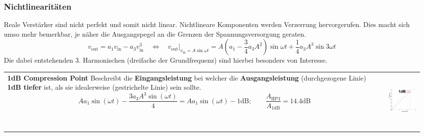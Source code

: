 \subsubsection{Nichtlinearitäten }
Reale Verstärker sind nicht perfekt und somit nicht linear. Nichtlineare Komponenten
werden Verzerrung hervorgerufen. Dies macht sich umso mehr bemerkbar, je näher
die Ausgangspegel an die Grenzen der Spannungsversorgung geraten.
$$ v_{\text{out}} = a_1 v_{\text{in}} - a_3 v_{\text{in}}^3 \quad \Longleftrightarrow \quad  
v_{\text{out}}|_{v_{\text{in}}=A \sin \omega t} = A(a_1 -\frac 34a_3A^2)\sin  \omega t
                      +\frac 14a_3A^3\sin 3\omega t$$
Die dabei entstehenden 3. Harmonischen (dreifache der Grundfrequenz) sind hierbei besonders von
Interesse. \\

\begin{tabular}{ll}
\parbox{12cm}{
    \textbf{1dB Compression Point} \\
    Beschreibt die \textbf{Eingangsleistung} bei welcher die \textbf{Ausgangsleistung}
    (durchgezogene Linie) \textbf{1dB tiefer} ist, als sie idealerweise (gestrichelte Linie) sein
    sollte. $$ A a_1 \sin(\omega t) - \frac{3 a_3 A^3 \sin(\omega t)}{4} = A a_1 \sin(\omega t) -
    1\text{dB}; \qquad \frac{A_{\text{IIP3}}}{A_{\text{1dB}}}=14.4 \text{dB}$$ }
& \parbox{6cm}{        
        \includegraphics[height=3cm]{./bilder/components_amplifier_nonlinear_1db.png}
        }\\
\end{tabular}\\        
               
